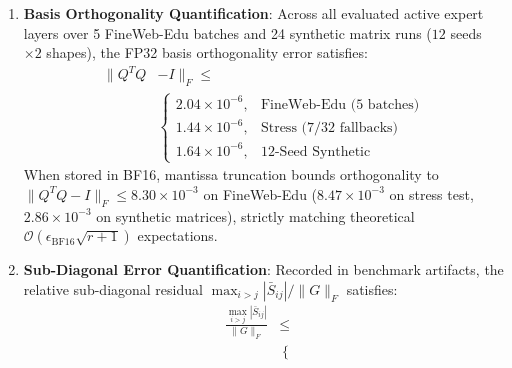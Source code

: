\documentclass[10pt,twocolumn,letterpaper]{article}
\begin{document}
\begin{enumerate}
\begin{itemize}
        \item \emph{Live Multi-Step Training Telemetry}: Across active 200-step continuation training over $N=12$ random seeds ($102,400$ tokens/seed) from \texttt{step\_36500.pt} with periodic refresh interval $\tau_{\text{gap}} = 20$ and zero-gradient expert skipping ($11,832$ total QR operations across 12 seeds), $\mathbf{83.76\%}$ ($9,910 / 11,832$) of calls execute on the fast \texttt{sCholQR2} path while only $16.24\%$ ($1,922 / 11,832$) route through sliced Householder fallback ($1,409$ degenerate columns [$73.3\%$], $513$ Cholesky non-PD minors [$26.7\%$]). On the earlier \texttt{step\_35500.pt} stage ($3$ seeds, $3,066$ live QR calls), $\mathbf{84.64\%}$ ($2,595 / 3,066$) survive on the \texttt{sCholQR2} fast path ($15.36\%$ fallback).
    \end{itemize}
    \item \textbf{Basis Orthogonality Quantification}: Across all evaluated active expert layers over 5 FineWeb-Edu batches and 24 synthetic matrix runs ($12$ seeds $\times 2$ shapes), the FP32 basis orthogonality error satisfies:
    \begin{equation}
    \begin{aligned}
        \|Q^T Q &- I\|_F \le \\
        &\begin{cases}
            2.04 \times 10^{-6}, & \text{FineWeb-Edu (5 batches)} \\
            1.44 \times 10^{-6}, & \text{Stress (7/32 fallbacks)} \\
            1.64 \times 10^{-6}, & \text{12-Seed Synthetic}
        \end{cases}
    \end{aligned}
    \end{equation}
    When stored in BF16, mantissa truncation bounds orthogonality to $\|Q^T Q - I\|_F \le 8.30 \times 10^{-3}$ on FineWeb-Edu ($8.47 \times 10^{-3}$ on stress test, $2.86 \times 10^{-3}$ on synthetic matrices), strictly matching theoretical $\mathcal{O}(\epsilon_{\text{BF16}} \sqrt{r+1})$ expectations.
    \item \textbf{Sub-Diagonal Error Quantification}: Recorded in benchmark artifacts, the relative sub-diagonal residual $\max_{i > j} |\bar{S}_{ij}| / \|G\|_F$ satisfies:
    \begin{equation}
    \begin{aligned}
        \frac{\max_{i > j} |\bar{S}_{ij}|}{\|G\|_F} &\le \\
        &\begin{cases}

\end{cases}
\end{aligned}
\end{equation}
\end{enumerate}
\end{document}
